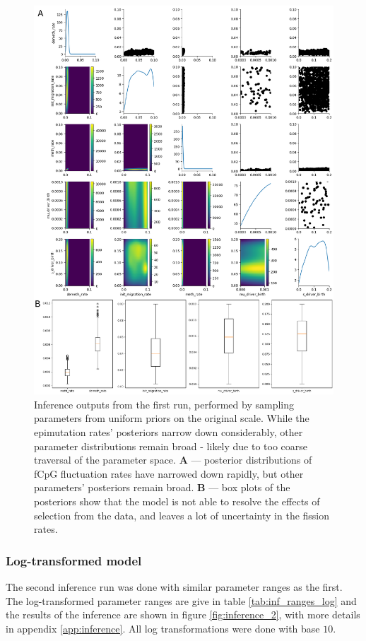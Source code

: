 \begin{figure}[h]
    \centering
    \includegraphics[width=\textwidth]{Chapter_5/figures/inference_raw/inference_1.pdf}
    \caption{Inference outputs from the first run, performed by sampling
    parameters from uniform priors on the original scale. While the epimutation
    rates' posteriors narrow down considerably, other parameter distributions
    remain broad - likely due to too coarse traversal of the parameter space.
    \textbf{A} --- posterior distributions of fCpG fluctuation rates have
    narrowed down rapidly, but other parameters' posteriors remain broad.
    \textbf{B} --- box plots of the posteriors show that the model is not able
    to resolve the effects of selection from the data, and leaves a lot of
    uncertainty in the fission rates.}
    \label{fig:inference_1}
\end{figure}
\clearpage

\subsubsection{Log-transformed model}
The second inference run was done with similar parameter ranges as the first.
The log-transformed parameter ranges are give in table \ref{tab:inf_ranges_log}
and the results of the inference are shown in figure \ref{fig:inference_2}, with
more details in appendix \ref{app:inference}. All log transformations were
done with base $10$.

